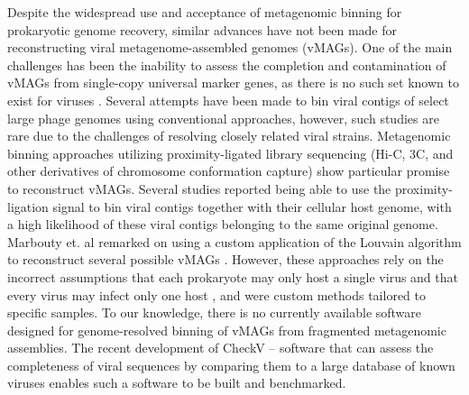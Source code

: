 Despite the widespread use and acceptance of metagenomic binning for prokaryotic genome recovery, similar advances have not been made for reconstructing viral metagenome-assembled genomes (vMAGs). One of the main challenges has been the inability to assess the completion and contamination of vMAGs from single-copy universal marker genes, as there is no such set known to exist for viruses \cite{RN2973}. Several attempts have been made to bin viral contigs of select large phage genomes using conventional approaches\cite{RN2972, RN2965}, however, such studies are rare due to the challenges of resolving closely related viral strains. Metagenomic binning approaches utilizing proximity-ligated library sequencing (Hi-C, 3C, and other derivatives of chromosome conformation capture) show particular promise to reconstruct vMAGs. Several studies reported being able to use the proximity-ligation signal to bin viral contigs together with their cellular host genome, with a high likelihood of these viral contigs belonging to the same original genome\cite{RN2974, RN2975}. Marbouty et. al remarked on using a custom application of the Louvain algorithm to reconstruct several possible vMAGs \cite{RN2976}. However, these approaches rely on the incorrect assumptions that each prokaryote may only host a single virus and that every virus may infect only one host \cite{RN2979}, and were custom methods tailored to specific samples. To our knowledge, there is no currently available software designed for genome-resolved binning of vMAGs from fragmented metagenomic assemblies. The recent development of CheckV – software that can assess the completeness of viral sequences by comparing them to a large database of known viruses \cite{RN12} enables such a software to be built and benchmarked. 

